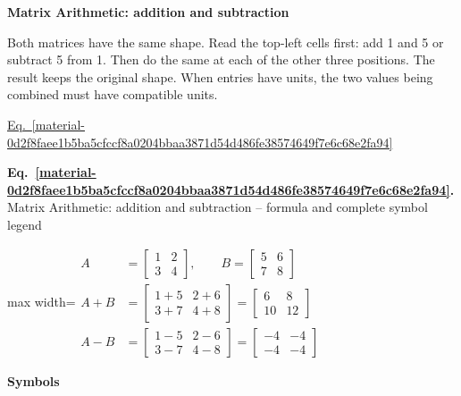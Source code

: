 \documentclass[11pt,a4paper]{article}
\begin{document}
\textbf{Matrix Arithmetic: addition and subtraction}


Both matrices have the same shape. Read the top-left cells first: add 1 and 5 or subtract 5 from 1. Then do the same at each of the other three positions. The result keeps the original shape. When entries have units, the two values being combined must have compatible units.


\hyperref[material-0d2f8faee1b5ba5cfccf8a0204bbaa3871d54d486fe38574649f7e6c68e2fa94]{Eq.~\ref*{material-0d2f8faee1b5ba5cfccf8a0204bbaa3871d54d486fe38574649f7e6c68e2fa94}}


\par\medskip
\noindent\begin{minipage}{\linewidth}
\label{material-0d2f8faee1b5ba5cfccf8a0204bbaa3871d54d486fe38574649f7e6c68e2fa94}
\noindent\textbf{Eq.~\ref*{material-0d2f8faee1b5ba5cfccf8a0204bbaa3871d54d486fe38574649f7e6c68e2fa94}.} Matrix Arithmetic: addition and subtraction – formula and complete symbol legend\par\nopagebreak
\begin{center}\begin{adjustbox}{max width=\linewidth}$\displaystyle \begin{aligned}A&=\begin{bmatrix}1&2\\3&4\end{bmatrix},\qquad B=\begin{bmatrix}5&6\\7&8\end{bmatrix}\\A+B&=\begin{bmatrix}\boxed{1+5}&2+6\\3+7&4+8\end{bmatrix}=\begin{bmatrix}6&8\\10&12\end{bmatrix}\\A-B&=\begin{bmatrix}\boxed{1-5}&2-6\\3-7&4-8\end{bmatrix}=\begin{bmatrix}-4&-4\\-4&-4\end{bmatrix}\end{aligned}$\end{adjustbox}\end{center}

\par\noindent\textbf{Symbols}


\end{minipage}
\end{document}
